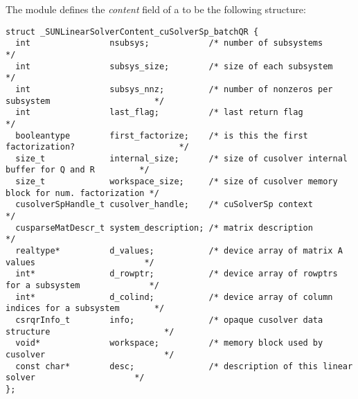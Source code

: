 The  module defines the
{\em content} field of a  to be the following structure:
\begin{verbatim} 
struct _SUNLinearSolverContent_cuSolverSp_batchQR {
  int                nsubsys;            /* number of subsystems                                 */
  int                subsys_size;        /* size of each subsystem                               */
  int                subsys_nnz;         /* number of nonzeros per subsystem                     */
  int                last_flag;          /* last return flag                                     */
  booleantype        first_factorize;    /* is this the first factorization?                     */
  size_t             internal_size;      /* size of cusolver internal buffer for Q and R         */
  size_t             workspace_size;     /* size of cusolver memory block for num. factorization */
  cusolverSpHandle_t cusolver_handle;    /* cuSolverSp context                                   */
  cusparseMatDescr_t system_description; /* matrix description                                   */
  realtype*          d_values;           /* device array of matrix A values                      */
  int*               d_rowptr;           /* device array of rowptrs for a subsystem              */
  int*               d_colind;           /* device array of column indices for a subsystem       */
  csrqrInfo_t        info;               /* opaque cusolver data structure                       */
  void*              workspace;          /* memory block used by cusolver                        */
  const char*        desc;               /* description of this linear solver                    */
};  
\end{verbatim}
